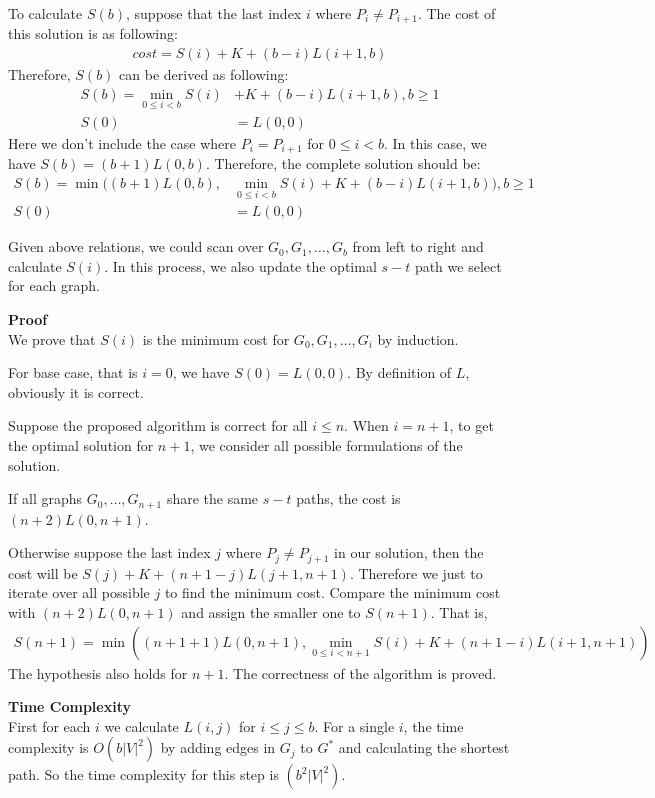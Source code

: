 \documentclass{article}
\newcommand{\Complexity}{\vspace{0.3cm} \noindent\textbf{Time Complexity} \\}
\newcommand{\Proof}{\vspace{0.3cm} \noindent\textbf{Proof} \\}
\begin{document}
To calculate $S(b)$, suppose that the last index $i$ where $P_i \neq P_{i+1}$. The cost of this
solution is as following:
\begin{align}
  cost = S(i) + K + (b - i)L(i+1, b)
\end{align}
Therefore, $S(b)$ can be derived as following:
\begin{align}
  S(b) = \min_{0\leq i < b} S(i) & + K + (b-i)L(i+1, b), b \geq 1\\
  S(0) &= L(0,0)
\end{align}
Here we don't include the case where $P_i = P_{i+1}$ for $ 0 \leq i < b$. In this case, we have 
$S(b) = (b+1)L(0, b)$. Therefore, the complete solution should be:
\begin{align}
  S(b) = \min((b+1)L(0,b), & \min_{0\leq i < b} S(i) + K + (b-i)L(i+1, b)), b\geq 1 \\
  S(0) &= L(0, 0)
\end{align}

Given above relations, we could scan over $G_0, G_1, \dots, G_b$ from left to right and calculate 
$S(i)$. In this process, we also update the optimal $s-t$ path we select for each graph. 

\Proof
We prove that $S(i)$ is the minimum cost for $G_0, G_1, \dots, G_i$ by induction.

For base case, that is $i=0$, we have $S(0) = L(0,0)$. By definition of $L$, obviously it is
correct.

Suppose the proposed algorithm is correct for all $i \leq n$. When $i = n+1$, to get the optimal
solution for $n+1$, we consider all possible formulations of the solution. 

If all graphs $G_0, \dots, G_{n+1}$ share the same $s-t$ paths, the cost is $(n+2)L(0, n+1)$.

Otherwise suppose the last index 
$j$ where $P_j \neq P_{j+1}$ in our solution, then the cost will be $S(j) + K + (n+1-j) L(j+1,
n+1)$. Therefore we just to iterate over all possible $j$ to find the minimum cost. Compare the
minimum cost with $(n+2)L(0,n+1)$ and assign the smaller one to $S(n+1)$. That is,
\begin{align}
  S(n+1) = \min((n+1+1)L(0,n+1), \min_{0\leq i < n+1} S(i) + K + (n+1-i)L(i+1, n+1))
\end{align}
The hypothesis also holds for $n+1$. The correctness of the algorithm is proved.

\Complexity
First for each $i$ we calculate $L(i, j)$ for $ i \leq j \leq b$. For a single $i$, the time
complexity is $O(b|V|^2)$ by adding edges in $G_j$ to $G^*$ and calculating the shortest path.
So the time complexity for this step is $(b^2 |V|^2)$.
\end{document}
